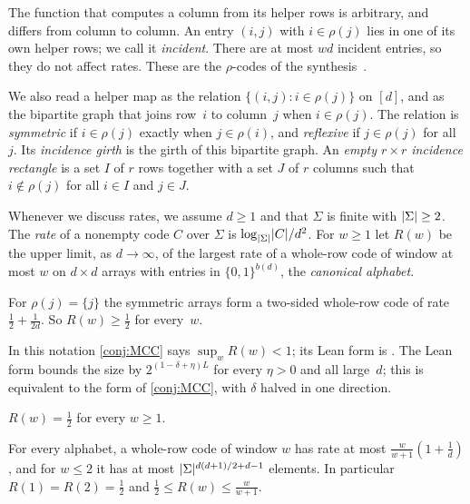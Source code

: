 The function that computes a column from its helper rows is arbitrary, and differs from column to column. An entry
$(i,j)$ with $i\in\rho(j)$ lies in one of its own helper rows; we call it \emph{incident}. There are at most $wd$
incident entries, so they do not affect rates. These are the $\rho$-codes of the
synthesis~\cite[Section~6.7]{SeventeenthPaper2026}.

We also read a helper map as the relation $\{(i,j):i\in\rho(j)\}$ on $[d]$, and as the bipartite graph that joins
row~$i$ to column~$j$ when $i\in\rho(j)$. The relation is \emph{symmetric} if $i\in\rho(j)$ exactly when
$j\in\rho(i)$, and \emph{reflexive} if $j\in\rho(j)$ for all~$j$. Its \emph{incidence girth} is the girth of this
bipartite graph. An \emph{empty $r\times r$ incidence rectangle} is a set $I$ of $r$ rows together with a set $J$ of
$r$ columns such that $i\notin\rho(j)$ for all $i\in I$ and $j\in J$.

\begin{definition}[Rates]\label{def:rate}
Whenever we discuss rates, we assume $d\ge1$ and that $\Sigma$ is finite with $\lvert \Sigma \rvert\ge2$.
The \emph{rate} of a nonempty code $C$ over $\Sigma$ is $\log_{\lvert \Sigma \rvert}\lvert C \rvert/d^2$. For $w\ge1$ let $R(w)$ be the
upper limit, as $d\to\infty$, of the largest rate of a whole-row code of window at most $w$ on $d\times d$ arrays with
entries in $\{0,1\}^{b(d)}$, the \emph{canonical alphabet}.
\end{definition}

\begin{example}[Pairing]\label{ex:pairing}
For $\rho(j)=\{j\}$ the symmetric arrays form a two-sided whole-row code of rate $\tfrac12+\tfrac1{2d}$. So
$R(w)\ge\tfrac12$ for every~$w$.
\end{example}

In this notation \cref{conj:MCC} says $\sup_wR(w)<1$; its Lean form is
. The Lean form bounds the size by $2^{(1-\delta+\eta)L}$ for every $\eta>0$ and all large~$d$;
this is equivalent to the form of \cref{conj:MCC}, with $\delta$ halved in one direction.

\begin{conjecture}\label{conj:half}
$R(w)=\tfrac12$ for every $w\ge1$.
\end{conjecture}

\begin{proposition}\label{prop:known}
For every alphabet, a whole-row code of window $w$ has rate at most $\tfrac{w}{w+1}(1+\tfrac1d)$, and for $w\le2$ it
has at most $\lvert \Sigma \rvert^{d(d+1)/2+d-1}$ elements. In particular $R(1)=R(2)=\tfrac12$ and
$\tfrac12\le R(w)\le\tfrac{w}{w+1}$.
\end{proposition}

